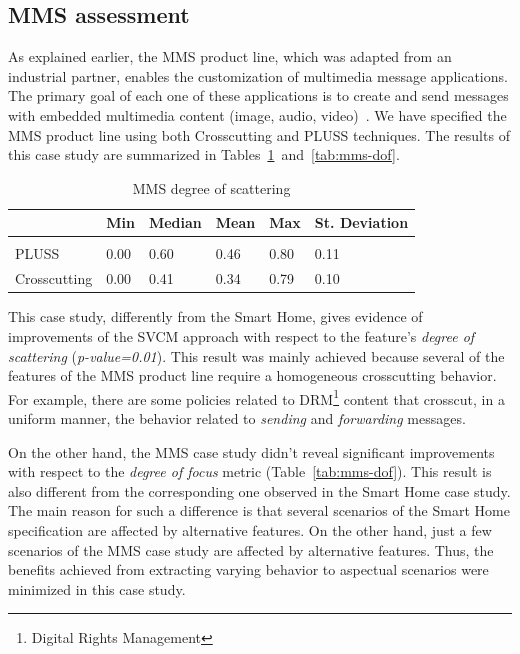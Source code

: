\documentclass{acm_proc_article-sp}
\begin{document}

\subsection{MMS assessment}

As explained earlier, the MMS product line, which was adapted from an industrial
partner, enables the customization of multimedia message applications. The
primary goal of each one of these applications is to create and send messages
with embedded multimedia content (image, audio, video)~\cite{Bonifacio:2008aa}.
We have specified the MMS product line using both Crosscutting and PLUSS
techniques. The results of this case study are
summarized in Tables~\ref{tab:mms-dos}~and~\ref{tab:mms-dof}.

\begin{table}[htb] \centering
\caption{MMS degree of scattering}
\label{tab:mms-dos}
\begin{small}
\begin{tabular}{llllll} \hline
					& Min 	& Median 	& Mean 	& Max 	& St. Deviation \\ \hline \\
	PLUSS			& 0.00  & 0.60   	& 0.46  & 0.80 	& 0.11 			\\
	Crosscutting	& 0.00  & 0.41   	& 0.34 	& 0.79 	& 0.10			\\ \hline	
\end{tabular}
\end{small}
\end{table}

This case study, differently from the Smart Home, gives evidence of improvements of the
SVCM approach with respect to the feature's \emph{degree of scattering}
(\emph{p-value=0.01}). This result was mainly achieved because several of the features of
the MMS product line require a homogeneous crosscutting behavior. For example,
there are some policies related to DRM\footnote{Digital Rights Management}
content that crosscut, in a uniform manner, the behavior related to
\emph{sending} and \emph{forwarding} messages.

On the other hand, the MMS case study didn't reveal significant improvements with
respect to the \emph{degree of focus} metric (Table~\ref{tab:mms-dof}). This
result is also different from the corresponding one observed in the Smart Home
case study. The main reason for such a difference is that several scenarios of
the Smart Home specification are affected by alternative features. On the other
hand, just a few scenarios of the MMS case study are affected by alternative
features. Thus, the benefits achieved from extracting varying behavior to
aspectual scenarios were minimized in this case study.
\end{document}
